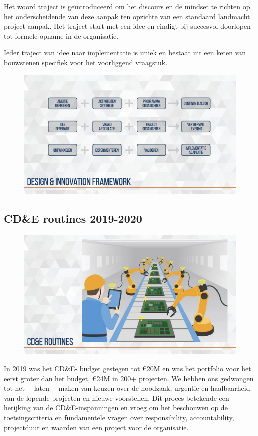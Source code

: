 \documentclass[
]{book}
\begin{document}
Het woord traject is geïntroduceerd om het discours en de mindset te richten op het onderscheidende van deze aanpak ten opzichte van een standaard landmacht project aanpak. Het traject start met een idee en eindigt bij succesvol doorlopen tot formele opname in de organisatie.

Ieder traject van idee naar implementatie is uniek en bestaat uit een keten van bouwstenen specifiek voor het voorliggend vraagstuk.

\begin{figure}

{\centering \includegraphics[width=0.5\linewidth]{data/keynote-slides/20200430-CDE-Designprocess/20200430-CDE-Designprocess.027} 

}

\caption{ }\label{fig:unnamed-chunk-24}
\end{figure}

\hypertarget{cde-routines-2019-2020}{%
\subsection{CD\&E routines 2019-2020}\label{cde-routines-2019-2020}}

\begin{figure}

{\centering \includegraphics[width=0.5\linewidth]{data/keynote-slides/20200430-CDE-Designprocess/20200430-CDE-Designprocess.034} 

}

\caption{ }\label{fig:unnamed-chunk-25}
\end{figure}

In 2019 was het CD\&E- budget gestegen tot €20M en was het portfolio voor het eerst groter dan het budget, €24M in 200+ projecten. We hebben ons gedwongen tot het ---laten--- maken van keuzen over de noodzaak, urgentie en haalbaarheid van de lopende projecten en nieuwe voorstellen. Dit proces betekende een herijking van de CD\&E-inspanningen en vroeg om het beschouwen op de toetsingscriteria en fundamentele vragen over responsibility, accountability, projectduur en waarden van een project voor de organisatie.
\end{document}
